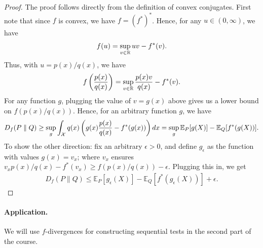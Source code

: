         \begin{proof}
            The proof follows directly from the definition of convex conjugates. First note that since $f$ is convex, we have $f = (f^*)^*$. Hence, for any $u \in (0, \infty)$, we have 
            \begin{align}
                f(u) = \sup_{v \in \mathbb{R}} u v - f^*(v). 
            \end{align}
            Thus, with $u= p(x)/q(x)$, we have 
            \begin{align}
                f\left( \frac{p(x)}{q(x)} \right) = \sup_{v \in \mathbb{R}} \frac{p(x) v}{q(x)} - f^*(v). 
            \end{align}
            For any function $g$, plugging the value of $v = g(x)$ above gives us a lower bound on $f(p(x)/q(x))$. Hence, for an arbitrary function $g$, we have 
            \begin{align}
                D_f(P \parallel Q) \geq \sup_{g } \int_{\mathcal{X}} q(x) \left( g(x) \frac{p(x)}{q(x)} - f^*(g(x)) \right) dx = \sup_{g} \mathbb{E}_P[g(X)]  - \mathbb{E}_Q[f^*(g(X))]. 
            \end{align}
            To show the other direction: fix an arbitrary $\epsilon >0$, and define $g_\epsilon$ as the function with values $g(x) = v_x$; where $v_x$ ensures $v_x p(x)/q(x)- f^*(v_x) \geq f(p(x)/q(x)) - \epsilon$. Plugging this in, we get 
            \begin{align}
                D_f(P \parallel Q)  \leq   \mathbb{E}_P[g_\epsilon(X)] - \mathbb{E}_Q[f^*(g_\epsilon(X))]  + \epsilon. 
            \end{align}
        \end{proof}


        \paragraph{Application.} We will use $f$-divergences for constructing sequential tests in the second part of the course. 